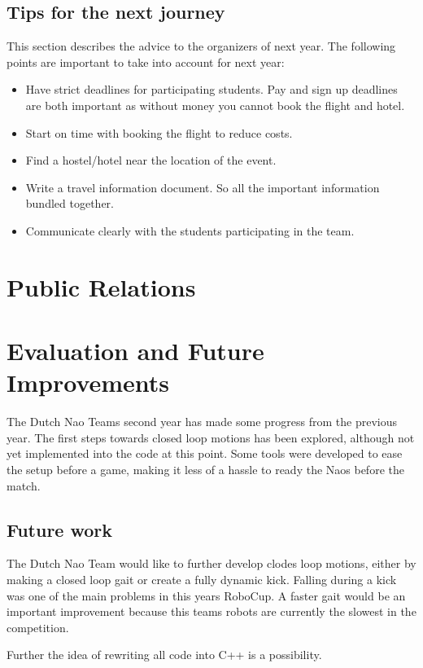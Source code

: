 \documentclass[11pt,a4paper,oneside]{article}
\begin{document}
\subsection{Tips for the next journey}
This section describes the advice to the organizers of next year. The following points are important to take into account for next year:
\begin{itemize}
\item Have strict deadlines for participating students. Pay and sign up deadlines are both important as without money you cannot book the flight and hotel.
\item Start on time with booking the flight to reduce costs.
\item Find a hostel/hotel near the location of the event.
\item Write a travel information document. So all the important information bundled together.
\item Communicate clearly with the students participating in the team.
\end{itemize}

\section{Public Relations}




\section{Evaluation and Future Improvements}

The Dutch Nao Teams second year has made some progress from the previous year. The first steps towards closed loop motions has been explored, although not yet implemented into the code at this point. Some tools were developed to ease the setup before a game, making it less of a hassle to ready the Naos before the match.

\subsection{Future work}
The Dutch Nao Team would like to further develop clodes loop motions, either by making a closed loop gait or create a fully dynamic kick. Falling during a kick was one of the main problems in this years RoboCup. A faster gait would be an important improvement because this teams robots are currently the slowest in the competition.

Further the idea of rewriting all code into C++ is a possibility.
\end{document}
